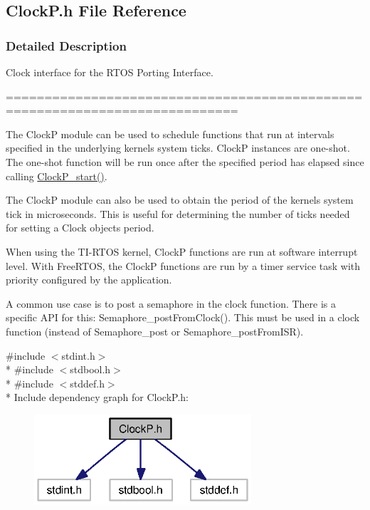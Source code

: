 \subsection{Clock\+P.\+h File Reference}
\label{_clock_p_8h}


\subsubsection{Detailed Description}
Clock interface for the R\+T\+O\+S Porting Interface. 

============================================================================

The Clock\+P module can be used to schedule functions that run at intervals specified in the underlying kernel\textquotesingle{}s system ticks. Clock\+P instances are one-\/shot. The one-\/shot function will be run once after the specified period has elapsed since calling \hyperlink{_clock_p_8h_a72fe821307efbdb0e314108857e39e56}{Clock\+P\+\_\+start()}.

The Clock\+P module can also be used to obtain the period of the kernel\textquotesingle{}s system tick in microseconds. This is useful for determining the number of ticks needed for setting a Clock object\textquotesingle{}s period.

When using the T\+I-\/\+R\+T\+O\+S kernel, Clock\+P functions are run at software interrupt level. With Free\+R\+T\+O\+S, the Clock\+P functions are run by a timer service task with priority configured by the application.

A common use case is to post a semaphore in the clock function. There is a specific A\+P\+I for this\+: Semaphore\+\_\+post\+From\+Clock(). This must be used in a clock function (instead of Semaphore\+\_\+post or Semaphore\+\_\+post\+From\+I\+S\+R). 

{\ttfamily \#include $<$stdint.\+h$>$}\\*
{\ttfamily \#include $<$stdbool.\+h$>$}\\*
{\ttfamily \#include $<$stddef.\+h$>$}\\*
Include dependency graph for Clock\+P.\+h\+:
\nopagebreak
\begin{figure}[H]
\begin{center}
\leavevmode
\includegraphics[width=229pt]{_clock_p_8h__incl}
\end{center}
\end{figure}
